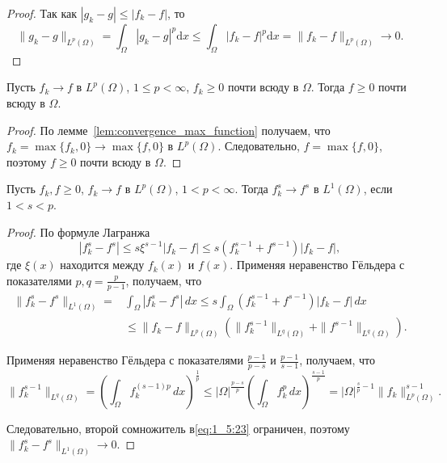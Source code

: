 \begin{proof}
    Так как $|g_k - g| \leq |f_k - f|$, то
    \begin{equation*}
        \|g_k - g\|_{L^p(\Omega)} =
        \int_{\Omega} |g_k - g|^p \mathrm{d}x
        \leq \int_{\Omega} |f_k - f|^p \mathrm{d}x =
        \|f_k - f\|_{L^p(\Omega)} \to 0.
    \end{equation*}
\end{proof}

\begin{lemma}
    \label{lem:convergence_positive_functions}
    Пусть $f_k \to f$ в $L^p(\Omega)$, $1 \leq p < \infty$,
    $f_k \geq 0$ почти всюду в $\Omega$.
    Тогда $f \geq 0$ почти всюду в $\Omega$.
\end{lemma}

\begin{proof}
    По лемме~\ref{lem:convergence_max_function} получаем,
    что $f_k = \max\{f_k, 0\} \to \max\{f, 0\}$ в $L^p(\Omega)$.
    Следовательно, $f = \max\{f, 0\}$,
    поэтому $f \geq 0$ почти всюду в $\Omega$.
\end{proof}

\begin{lemma}
    \label{lem:convergence_power_functions}
    Пусть $f_k, f \geq 0$, $f_k \to f$ в $L^p(\Omega)$, $1 < p < \infty$.
    Тогда $f_k^s \to f^s$ в $L^1(\Omega)$, если $1 < s < p$.
\end{lemma}

\begin{proof}
    По формуле Лагранжа
    \[
        |f_k^s - f^s| \leq s \xi^{s-1} |f_k - f|
        \leq s(f_k^{s-1} + f^{s-1}) |f_k - f|,
    \]
    где $\xi(x)$ находится между $f_k(x)$ и $f(x)$.
    Применяя неравенство Гёльдера с показателями
    $p, q = \frac{p}{p-1}$, получаем, что
    \begin{equation}
        \label{eq:1_5:23}
        \begin{split}
            \|f_k^s - f^s\|_{L^1(\Omega)} =
            &\int_{\Omega} |f_k^s - f^s| \, dx
            \leq s \int_{\Omega} (f_k^{s-1} + f^{s-1}) |f_k - f| \, dx \\
            &\leq \|f_k - f\|_{L^p(\Omega)} \left( \|f_k^{s-1}\|_{L^q(\Omega)}
            + \|f^{s-1}\|_{L^q(\Omega)} \right).
        \end{split}
    \end{equation}

    Применяя неравенство Гёльдера с показателями $\frac{p-1}{p-s}$
    и $\frac{p-1}{s-1}$, получаем, что
    \[
        \|f_k^{s-1}\|_{L^q(\Omega)} = \left(\int_{\Omega} f_k^{(s-1)p}\,
        dx\right)^{\frac{1}{p}} \leq |\Omega|^{\frac{p-s}{p}}
        \left(\int_{\Omega} f_k^p\, dx\right)^{\frac{s-1}{p}} =
        |\Omega|^{\frac{s}{p}-1} \|f_k\|_{L^p(\Omega)}^{s-1}.
    \]

    Следовательно, второй сомножитель в\eqref{eq:1_5:23} ограничен,
    поэтому $\|f_k^s - f^s\|_{L^1(\Omega)} \to 0$.
\end{proof}

